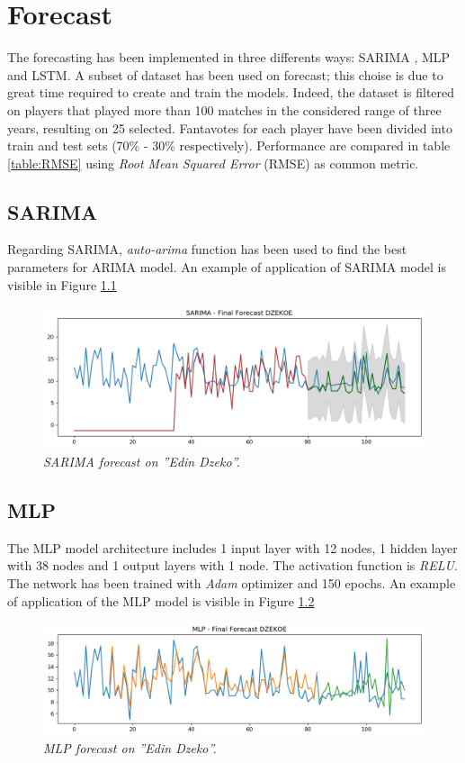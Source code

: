 \chapter {Forecast}

The forecasting has been implemented in three differents ways: SARIMA , MLP and LSTM.
A subset of dataset has been used on forecast; this choise is due to great time required to create and train the models.
Indeed, the dataset is filtered on players that played more than 100 matches in the considered range of three years, resulting on 25 selected.
Fantavotes for each player have been divided into train and test sets (70\% - 30\% respectively).
Performance are compared in table \ref{table:RMSE} using \textit{Root Mean Squared Error} (RMSE) as common metric.

\section{SARIMA}

Regarding SARIMA, \textit{auto-arima} function has been used to find the best parameters for ARIMA model.
An example of application of SARIMA model is visible in Figure \ref{fig:sarima}

\begin{figure}[H]
  \includegraphics[scale=0.5]{images/dzeko_sarima_fantavoti.png}
   \centering  
   \caption{\textit{SARIMA forecast on ''Edin Dzeko''.}}
  \label{fig:sarima}
\end{figure}

\section{MLP}
The MLP model architecture includes 1 input layer with 12 nodes, 1 hidden layer with 38 nodes and 1 output layers with 1 node. The activation function is \textit{RELU}.
The network has been trained with \textit{Adam} optimizer and 150 epochs.
An example of application of the MLP model is visible in Figure \ref{fig:mlp}
\begin{figure}[H]
  \includegraphics[scale=0.5]{images/dzeko_mlp_fantavoti.png}
   \centering  
   \caption{\textit{MLP forecast on ''Edin Dzeko''.}}
  \label{fig:mlp}
\end{figure}

